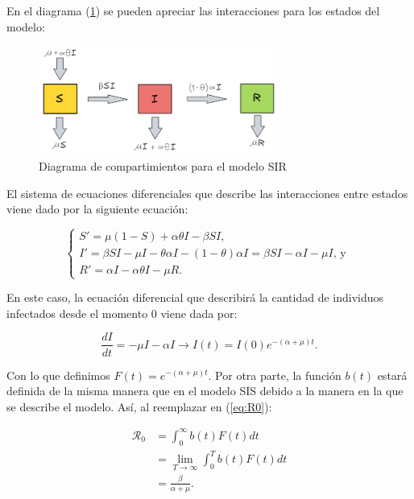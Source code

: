 En el diagrama (\ref{fig:diagrama SIR}) se pueden apreciar las interacciones para los estados del modelo:

\begin{figure}[h]
  \centering
    \includegraphics[width=0.7\textwidth]{Imagenes/SIR_compartimientos.PNG}
  \caption{Diagrama de compartimientos para el modelo SIR}
  \label{fig:diagrama SIR}
\end{figure}

El sistema de ecuaciones diferenciales que describe las interacciones entre estados viene dado por la siguiente ecuación:

\begin{equation}\label{eq:Modelo SIR}
\left\{
\begin{array}{l}
S' = \mu(1 - S) + \alpha\theta I - \beta S I, \\
I' = \beta S I - \mu I - \theta\alpha I - (1 - \theta)\alpha I = \beta S I - \alpha I - \mu I\text{, y } \\
R' = \alpha I - \alpha\theta I - \mu R.
\end{array}
\right.
\end{equation}

En este caso, la ecuación diferencial que describirá la cantidad de individuos infectados desde el momento 0 viene dada por:

\begin{equation}\label{eq:Infectados en el tiempo I - SIR}
    \frac{dI}{dt}=-\mu I - \alpha I \longrightarrow I(t)=I(0)e^{-(\alpha+\mu)t}.
\end{equation}

Con lo que definimos $F(t)=e^{-(\alpha+\mu)t}$. Por otra parte, la función $b(t)$ estará definida de la misma manera que en el modelo SIS debido a la manera en la que se describe el modelo. Así, al reemplazar en (\ref{eq:R0}):

\begin{align*}
\mathcal{R}_0 &= \int_0^\infty b(t)F(t) dt \\
&= \lim_{T\to\infty} \int_0^T b(t)F(t) dt \\
&= \frac{\beta}{\alpha+\mu}.
\end{align*}

